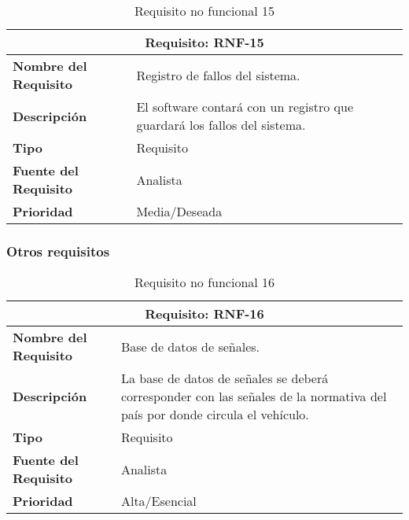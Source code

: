 \begin{table}[H]
\begin{center}
\begin{tabular}{p{} p{7cm}}
\multicolumn{2}{c}{\textbf{Requisito: RNF-15} } \\
\hline \hline
\textbf{Nombre del Requisito} & Registro de fallos del sistema.\\
\hline
\textbf{Descripción} & El software contará con un registro que guardará los fallos del sistema.\\
\hline
\textbf{Tipo} & Requisito  \\
\hline
\textbf{Fuente del Requisito} & Analista  \\
\hline
\textbf{Prioridad} & Media/Deseada \\ \hline
\end{tabular}
\caption{Requisito no funcional 15}
\label{tab:RNF-15}
\end{center}
\end{table}

\subsubsection{Otros requisitos}

\begin{table}[H]
\begin{center}
\begin{tabular}{p{} p{7cm}}
\multicolumn{2}{c}{\textbf{Requisito: RNF-16} } \\
\hline \hline
\textbf{Nombre del Requisito} & Base de datos de señales.\\
\hline
\textbf{Descripción} & La base de datos de señales se deberá corresponder con las señales de la normativa del país por donde circula el vehículo.\\
\hline
\textbf{Tipo} & Requisito  \\
\hline
\textbf{Fuente del Requisito} & Analista  \\
\hline
\textbf{Prioridad} & Alta/Esencial \\ \hline
\end{tabular}
\caption{Requisito no funcional 16}
\label{tab:RNF-16}
\end{center}
\end{table}

